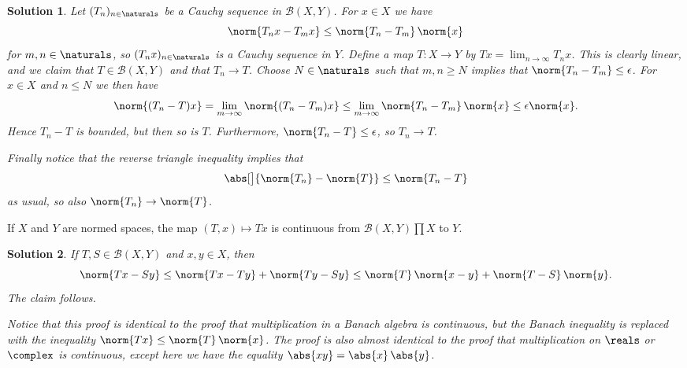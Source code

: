 \documentclass[article, a4paper, 11pt, oneside]{memoir}
\numberwithin{equation}{chapter}
\newcommand{\calB}{\mathcal{B}}
\theoremstyle{nonumberplain}
\newtheorem{solution}{Solution}
\begin{document}
\begin{solution}
	Let $(T_n)_{n\in\naturals}$ be a Cauchy sequence in $\calB(X,Y)$. For $x \in X$ we have
	\begin{equation*}
		\norm{T_n x - T_m x}
			\leq \norm{T_n - T_m} \, \norm{x}
	\end{equation*}
	for $m,n \in \naturals$, so $(T_n x)_{n\in\naturals}$ is a Cauchy sequence in $Y$. Define a map $T \colon X \to Y$ by $Tx = \lim_{n\to\infty} T_n x$. This is clearly linear, and we claim that $T \in \calB(X,Y)$ and that $T_n \to T$. Choose $N \in \naturals$ such that $m,n \geq N$ implies that $\norm{T_n - T_m} \leq \epsilon$. For $x \in X$ and $n \leq N$ we then have
	\begin{equation*}
		\norm{(T_n - T)x}
			= \lim_{m\to\infty} \norm{(T_n - T_m) x}
			\leq \lim_{m\to\infty} \norm{T_n - T_m} \, \norm{x}
			\leq \epsilon \norm{x}.
	\end{equation*}
	Hence $T_n - T$ is bounded, but then so is $T$. Furthermore, $\norm{T_n - T} \leq \epsilon$, so $T_n \to T$.

	Finally notice that the reverse triangle inequality implies that
	\begin{equation*}
		\abs[\big]{ \norm{T_n} - \norm{T} }
			\leq \norm{T_n - T}
	\end{equation*}
	as usual, so also $\norm{T_n} \to \norm{T}$.
\end{solution}


\begin{exerciseframed*}[4]
	If $X$ and $Y$ are normed spaces, the map $(T,x) \mapsto Tx$ is continuous from $\calB(X,Y) \prod X$ to $Y$.
\end{exerciseframed*}

\begin{solution}
	If $T,S \in \calB(X,Y)$ and $x,y \in X$, then
	\begin{equation*}
		\norm{Tx - Sy}
			\leq \norm{Tx - Ty} + \norm{Ty - Sy}
			\leq \norm{T} \, \norm{x - y} + \norm{T - S} \, \norm{y}.
	\end{equation*}
	The claim follows.

	Notice that this proof is identical to the proof that multiplication in a Banach algebra is continuous, but the Banach inequality is replaced with the inequality $\norm{Tx} \leq \norm{T} \, \norm{x}$. The proof is also almost identical to the proof that multiplication on $\reals$ or $\complex$ is continuous, except here we have the \emph{equality} $\abs{xy} = \abs{x} \, \abs{y}$.
\end{solution}
\end{document}
